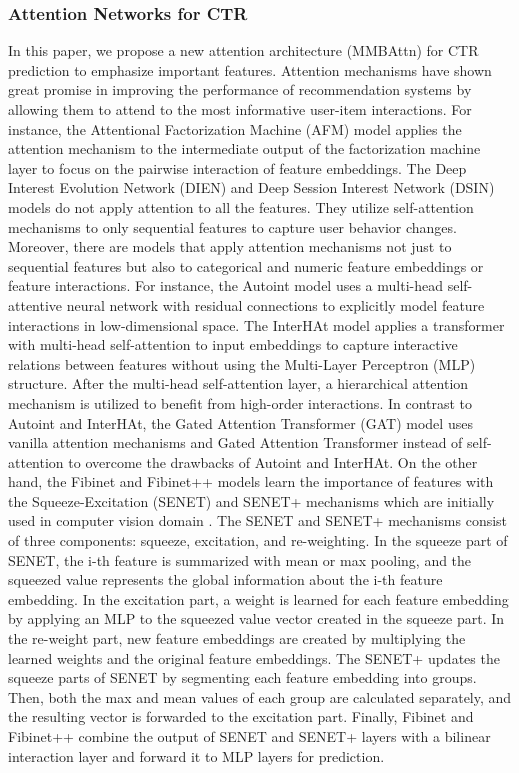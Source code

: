 \documentclass{article}
\begin{document}
\subsubsection{Attention Networks for CTR}
In this paper, we propose a new attention architecture (MMBAttn) for CTR prediction to emphasize important features. Attention mechanisms have shown great promise in improving the performance of recommendation systems by allowing them to attend to the most informative user-item interactions. For instance, the Attentional Factorization Machine (AFM) model \cite{xiao2017attentional} applies the attention mechanism to the intermediate output of the factorization machine layer to focus on the pairwise interaction of feature embeddings. The Deep Interest Evolution Network (DIEN) and Deep Session Interest Network (DSIN) models \cite{zhou2019deep, feng2019deep} do not apply attention to all the features. They utilize self-attention mechanisms to only sequential features to capture user behavior changes. Moreover, there are models that apply attention mechanisms not just to sequential features but also to categorical and numeric feature embeddings or feature interactions. For instance, the Autoint model \cite{song2019autoint} uses a multi-head self-attentive neural network with residual connections to explicitly model feature interactions in low-dimensional space. The InterHAt model \cite{li2020interpretable} applies a transformer with multi-head self-attention to input embeddings to capture interactive relations between features without using the Multi-Layer Perceptron (MLP) structure. After the multi-head self-attention layer, a hierarchical attention mechanism is utilized to benefit from high-order interactions. In contrast to Autoint and InterHAt, the Gated Attention Transformer (GAT) model \cite{long2021efficient} uses vanilla attention mechanisms and Gated Attention Transformer instead of self-attention to overcome the drawbacks of Autoint and InterHAt.
On the other hand, the Fibinet and Fibinet++ models \cite{huang2019fibinet, zhang2022fibinet++} learn the importance of features with the Squeeze-Excitation (SENET) and SENET+ mechanisms which are initially used in computer vision domain \cite{wang2020eca}. The SENET and SENET+ mechanisms consist of three components: squeeze, excitation, and re-weighting. In the squeeze part of SENET, the i-th feature is summarized with mean or max pooling, and the squeezed value represents the global information about the i-th feature embedding. In the excitation part, a weight is learned for each feature embedding by applying an MLP to the squeezed value vector created in the squeeze part. In the re-weight part, new feature embeddings are created by multiplying the learned weights and the original feature embeddings. The SENET+ updates the squeeze parts of SENET by segmenting each feature embedding into  groups. Then, both the max and mean values of each group are calculated separately, and the resulting vector is forwarded to the excitation part. Finally, Fibinet and Fibinet++ combine the output of SENET and SENET+ layers with a bilinear interaction layer and forward it to MLP layers for prediction.
\end{document}
